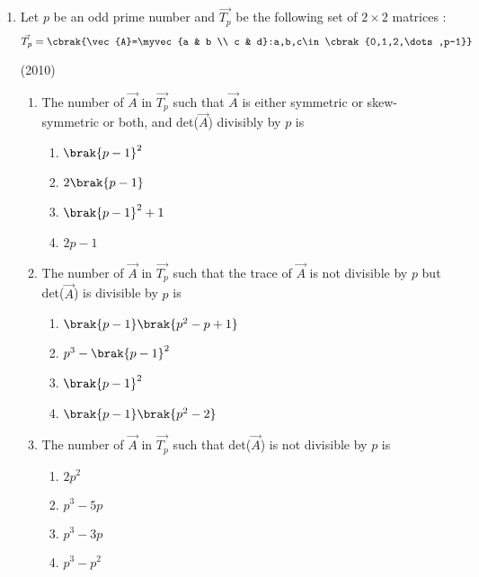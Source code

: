 \begin{enumerate}

	\item Let $p$ be an odd prime number and $\vec{T_p}$ be the following set of $2\times2$ matrices :
	$$\vec{T_p}=\cbrak{\vec{A}=\myvec{a & b \\ c & d}:a,b,c\in\cbrak{0,1,2,\dots,p-1}}$$

			\hfill(2010)
	
	\begin{enumerate}
		\item The number of $\vec{A}$ in $\vec{T_p}$ such that $\vec{A}$ is either symmetric or skew-symmetric or both, and det($\vec{A}$) divisibly by $p$ is
			\begin{enumerate}
				\item $\brak{p-1}^2$
				\item $2\brak{p-1}$
				\item $\brak{p-1}^2+1$
				\item $2p-1$
			\end{enumerate}


		\item The number of $\vec{A}$ in $\vec{T_p}$ such that the trace of $\vec{A}$ is not divisible by $p$ but det($\vec{A}$) is divisible by $p$ is

			
			\begin{enumerate}
				\item $\brak{p-1}\brak{p^2-p+1}$
				\item $p^3-\brak{p-1}^2$
				\item $\brak{p-1}^2$
				\item $\brak{p-1}\brak{p^2-2}$
			\end{enumerate}

		\item The number of $\vec{A}$ in $\vec{T_p}$ such that det($\vec{A}$) is not divisible by $p$ is 
			\begin{enumerate}
				\item $2p^2$
				\item $p^3-5p$
				\item $p^3-3p$
				\item $p^3-p^2$
			\end{enumerate}


\end{enumerate}
\end{enumerate}
